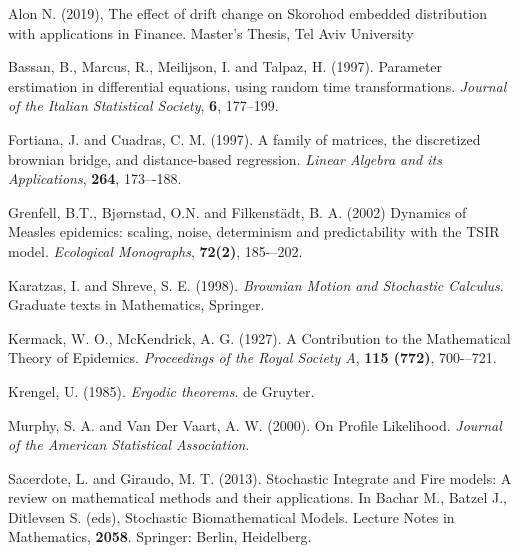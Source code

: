 \documentclass{article}
\begin{document}
\begin{thebibliography}{99}

 Alon N. (2019), The effect of drift change on Skorohod embedded
distribution with applications in Finance. Master’s Thesis, Tel Aviv
University

 Bassan, B., Marcus, R., Meilijson, I. and Talpaz, H. (1997). Parameter erstimation in differential equations, using random time transformations. {\em Journal of the Italian Statistical Society}, {\bf 6}, 177--199.

 Fortiana, J. and Cuadras, C. M. (1997). A family of matrices, the
discretized brownian bridge, and distance-based regression. {\em Linear
Algebra and its Applications}, {\bf 264}, 173–-188.

 Grenfell, B.T., Bj{\o}rnstad, O.N. and Filkenst\"{a}dt, B. A. (2002) Dynamics of Measles epidemics: scaling, noise, determinism and predictability with the TSIR model. {\em Ecological Monographs}, {\bf 72(2)}, 185-–202.

 Karatzas, I. and Shreve, S. E. (1998). {\em Brownian Motion and Stochastic Calculus}. Graduate texts in Mathematics, Springer.

  Kermack, W. O., McKendrick, A. G. (1927). A Contribution to the Mathematical Theory of Epidemics. {\em Proceedings of the Royal Society A}, {\bf 115 (772)}, 700-–721.

 Krengel, U. (1985). {\em Ergodic theorems}. de Gruyter.

 Murphy, S. A. and  Van Der Vaart, A. W. (2000). On Profile Likelihood. {\em Journal of the American Statistical Association}.

 Sacerdote, L. and Giraudo, M. T. (2013). Stochastic Integrate and Fire models: A review on mathematical methods and their applications. In Bachar M., Batzel J., Ditlevsen S. (eds), Stochastic Biomathematical Models. Lecture Notes in Mathematics, {\bf 2058}. Springer: Berlin, Heidelberg.

\end{thebibliography}
\end{document}
